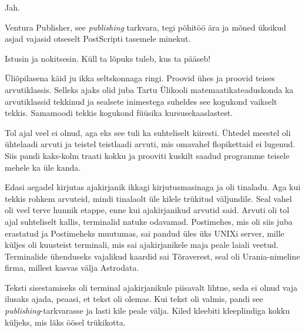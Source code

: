 
Jah.


Ventura Publisher, see \emph{publishing} tarkvara, tegi põhitöö ära ja mõned üksikud asjad vajasid otseselt 
PostScripti tasemele minekut. 


Istusin ja nokitsesin. Küll ta lõpuks tuleb, kus ta pääseb!


Üliõpilasena käid ju ikka seltskonnaga ringi. Proovid ühes ja
proovid teises arvutiklassis. Selleks ajaks olid juba Tartu Ülikooli 
matemaatikateaduskonda ka 
arvutiklassid tekkinud ja sealsete inimestega suheldes see kogukond vaikselt 
tekkis. Samamoodi tekkis kogukond füüsika 
kursusekaaslastest.


Tol ajal veel ei olnud, aga eks see tuli ka suhteliselt kiiresti. 
Ühtedel meestel oli ühtelaadi arvuti ja teistel teistlaadi arvuti, mis 
omavahel flopikettaid ei lugenud. Siis pandi kaks-kolm traati kokku ja 
prooviti kuskilt saadud programme teisele mehele ka üle kanda.


Edasi aegadel kirjutas ajakirjanik ikkagi kirjutusmasinaga ja oli 
tinaladu. Aga kui tekkis rohkem arvuteid, mindi tinalaolt üle kilele 
trükitud väljundile. Seal vahel oli veel terve hunnik etappe, enne kui ajakirjanikud 
arvutid said. Arvuti oli tol ajal suhteliselt kallis, terminalid 
natuke odavamad. Postimehes, mis oli siis juba erastatud ja 
Postimeheks muutumas, sai pandud üles üks UNIXi server, mille küljes oli 
kuusteist terminali, mis sai ajakirjanikele maja peale laiali veetud. 
Terminalide ühenduseks vajalikud kaardid sai Tõraverest, seal oli 
Urania-nimeline firma, millest kasvas välja 
Astrodata.

Teksti sisestamiseks oli terminal ajakirjanikule piisavalt lihtne, seda ei 
olnud vaja ilusaks ajada, peaasi, et tekst oli olemas. Kui tekst oli valmis, 
pandi see \emph{publishing}-tarkvarasse ja lasti kile peale välja. Kiled 
kleebiti kleeplindiga kokku küljeks, mis läks öösel trükikotta. 

